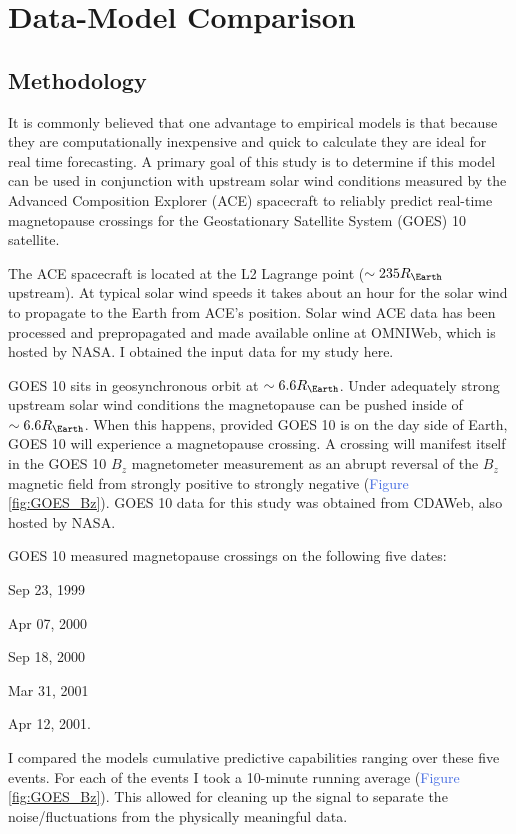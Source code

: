 \documentclass[12pt, letterpaper]{article}
\begin{document}
\section{Data-Model Comparison}
\label{sec:data-model}
\subsection{Methodology}
It is commonly believed that one advantage to empirical models is that because they are computationally inexpensive and quick to calculate they are ideal for real time forecasting. A primary goal of this study is to determine if this model can be used in conjunction with upstream solar wind conditions measured by the Advanced Composition Explorer (ACE) spacecraft to reliably predict real-time magnetopause crossings for the Geostationary Satellite System (GOES) 10 satellite. 

The ACE spacecraft is located at the L2 Lagrange point ($\sim 235 R_{\Earth}$ upstream). At typical solar wind speeds it takes about an hour for the solar wind to propagate to the Earth from ACE's position. Solar wind ACE data has been processed and prepropagated and made available online at OMNIWeb, which is hosted by NASA. I obtained the input data for my study here.

GOES 10 sits in geosynchronous orbit at $\sim 6.6 R_{\Earth}$. Under adequately strong upstream solar wind conditions the magnetopause can be pushed inside of $\sim 6.6 R_{\Earth}$. When this happens, provided GOES 10 is on the day side of Earth, GOES 10 will experience a magnetopause crossing. A crossing will manifest itself in the GOES 10 $B_{z}$ magnetometer measurement as an abrupt reversal of the $B_{z}$ magnetic field from strongly positive to strongly negative (\textcolor{RoyalBlue}{Figure \ref{fig:GOES_Bz}}). GOES 10 data for this study was obtained from CDAWeb, also hosted by NASA. 

GOES 10 measured magnetopause crossings on the following five dates: 
\begin{inparaenum}[$\cdot$]
  \item Sep 23, 1999
  \item Apr 07, 2000
  \item Sep 18, 2000
  \item Mar 31, 2001
  \item Apr 12, 2001.
\end{inparaenum} 
I compared the models cumulative predictive capabilities ranging over these five events. For each of the events I took a 10-minute running average (\textcolor{RoyalBlue}{Figure \ref{fig:GOES_Bz}}). This allowed for cleaning up the signal to separate the noise/fluctuations from the physically meaningful data.
\end{document}
